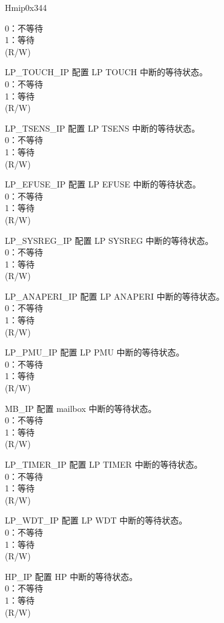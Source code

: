 \begin{register}{H}{mip}{0x344}
\begin{regdesc}
\begin{reglist}
0：不等待\\
1：等待\\(R/W)
\label{fielddesc:LPMIPTOUCHIP}\item [LP\_TOUCH\_IP] 配置 LP TOUCH 中断的等待状态。\\
0：不等待\\
1：等待\\(R/W)
\label{fielddesc:LPMIPTSENSIP}\item [LP\_TSENS\_IP] 配置 LP TSENS 中断的等待状态。\\
0：不等待\\
1：等待\\(R/W)
\label{fielddesc:LPMIPEFUSEIP}\item [LP\_EFUSE\_IP] 配置 LP EFUSE 中断的等待状态。\\
0：不等待\\
1：等待\\(R/W)
\label{fielddesc:LPMIPSYSREGIP}\item [LP\_SYSREG\_IP] 配置 LP SYSREG 中断的等待状态。\\
0：不等待\\
1：等待\\(R/W)
\label{fielddesc:LPMIPANAPERIIP}\item [LP\_ANAPERI\_IP] 配置 LP ANAPERI 中断的等待状态。\\
0：不等待\\
1：等待\\(R/W)
\label{fielddesc:LPMIPPMUIP}\item [LP\_PMU\_IP] 配置 LP PMU 中断的等待状态。\\
0：不等待\\
1：等待\\(R/W)
\label{fielddesc:LPMIPMBIP}\item [MB\_IP] 配置 mailbox 中断的等待状态。\\
0：不等待\\
1：等待\\(R/W)
\label{fielddesc:LPMIPTIMERIP}\item [LP\_TIMER\_IP] 配置 LP TIMER 中断的等待状态。\\
0：不等待\\
1：等待\\(R/W)
\label{fielddesc:LPMIPWDTIP}\item [LP\_WDT\_IP] 配置 LP WDT 中断的等待状态。\\
0：不等待\\
1：等待\\(R/W)
\label{fielddesc:LPMIPHPIP}\item [HP\_IP] 配置 HP 中断的等待状态。\\
0：不等待\\
1：等待\\(R/W)
\end{reglist}\end{regdesc}
\end{register}

